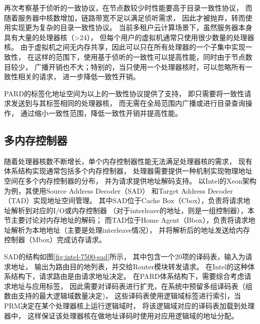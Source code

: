 再次考察基于侦听的一致协议，在节点数较少时性能要高于目录一致性协议，
而随着服务器中核数增加，链路带宽不足以满足侦听需求，
因此才被抛弃，转而使用实现更为复杂的目录一致性协议。
当前多租户云计算场景下，虽然服务器本身具有大量的处理器核（>24），
但每个用户的虚拟机通常只使用很少数量的处理器核。%
由于虚拟机之间无内存共享，因此可以只在所有处理器的一个子集中实现一致性，
在这样的范围下，使用基于侦听的一致性可以提高性能，同时由于节点数目较少，
广播开销也不大；特别的，当只使用一个处理器核时，可以忽略所有一致性相关的请求，
进一步降低一致性开销。

PARD的标签化地址空间为以上的一致性协议提供了支持，
即只需要将一致性请求发送到与其标签相同的处理器核，
而无需在全局范围内广播或进行目录查询操作，
通过缩小一致性范围，降低一致性开销并提高性能。



\subsection{多内存控制器}

随着处理器核数不断增长，单个内存控制器性能无法满足处理器核的需求，
现有体系结构实现通常包括多个内存控制器，
处理器需要提供一种机制实现物理地址空间在多个内存控制器的分布，
并为请求提供地址解码支持。
以Intel的Xeon架构为例，其使用Source Address Decoder（SAD）
和Target Address Decoder（TAD）实现地址空间管理\cite{intel-xeon-7500}。
其中SAD位于Cache Box（Cbox），负责将请求地址解析到对应的I/O或内存控制器
（对于interleave的地址，则是一组控制器），本节主要讨论对内存地址的解码；
而TAD位于Home Agent（Bbox），负责将请求地址解析为本地地址（主要是处理interleave情况），
并将解析后的地址发送给内存控制器（Mbox）完成访存请求。

SAD的结构如图\ref{fig:intel-7500-sad}所示，
其中包含一个20项的译码表，输入为请求地址，
输出为路由目的地列表，并交给Router模块转发请求。
在Intel的这种体系结构下，请求路由是由请求地址决定。
在PARD体系结构下，需要综合考虑请求地址与应用标签，
因此需要对译码表进行扩充，在系统中预留多组译码表（组数由支持的最大逻辑域数量决定)，
这些译码表使用逻辑域标签进行索引，当PRM决定在某个处理器核上运行逻辑域时，
将该逻辑域对应的译码表加载到处理器中，
这样保证该处理器核在做地址译码时使用对应用逻辑域的地址分配。

